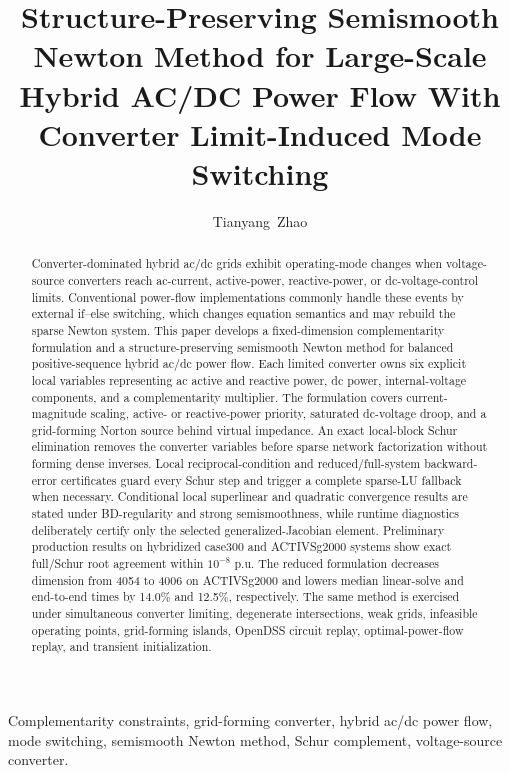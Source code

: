 \documentclass[journal,10pt]{IEEEtran}
\title{Structure-Preserving Semismooth Newton Method for Large-Scale Hybrid AC/DC Power Flow With Converter Limit-Induced Mode Switching}
\author{Tianyang~Zhao}
\begin{document}
\maketitle

\begin{abstract}
Converter-dominated hybrid ac/dc grids exhibit operating-mode changes when
voltage-source converters reach ac-current, active-power, reactive-power, or
dc-voltage-control limits. Conventional power-flow implementations commonly
handle these events by external if--else switching, which changes equation
semantics and may rebuild the sparse Newton system. This paper develops a
fixed-dimension complementarity formulation and a structure-preserving
semismooth Newton method for balanced positive-sequence hybrid ac/dc power
flow. Each limited converter owns six explicit local variables representing
ac active and reactive power, dc power, internal-voltage components, and a
complementarity multiplier. The formulation covers current-magnitude scaling,
active- or reactive-power priority, saturated dc-voltage droop, and a
grid-forming Norton source behind virtual impedance. An exact local-block
Schur elimination removes the converter variables before sparse network
factorization without forming dense inverses. Local reciprocal-condition and
reduced/full-system backward-error certificates guard every Schur step and
trigger a complete sparse-LU fallback when necessary. Conditional local
superlinear and quadratic convergence results are stated under BD-regularity
and strong semismoothness, while runtime diagnostics deliberately certify only
the selected generalized-Jacobian element. Preliminary production results on
hybridized case300 and ACTIVSg2000 systems show exact full/Schur root agreement
within $10^{-8}$ p.u. The reduced formulation decreases dimension from 4054
to 4006 on ACTIVSg2000 and lowers median linear-solve and end-to-end times by
14.0\% and 12.5\%, respectively. The same method is exercised under
simultaneous converter limiting, degenerate intersections, weak grids,
infeasible operating points, grid-forming islands, OpenDSS circuit replay,
optimal-power-flow replay, and transient initialization.
\end{abstract}

\begin{IEEEkeywords}
Complementarity constraints, grid-forming converter, hybrid ac/dc power flow,
mode switching, semismooth Newton method, Schur complement, voltage-source
converter.
\end{IEEEkeywords}
\end{document}
